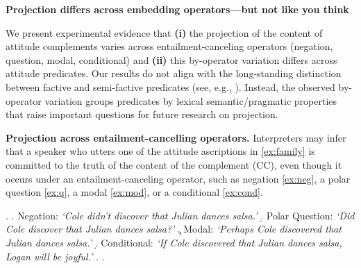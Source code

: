 \documentclass[12pt, a4paper]{article}
\begin{document}


\begin{center}
	\textbf{\large%
		Projection differs across embedding operators---but not like you think}
\end{center}

\vspace*{-.6\baselineskip}
\noindent 
	We present experimental evidence that \textbf{(i)} the projection of the content of attitude complements varies across entailment-canceling operators (negation, question, modal, conditional) and \textbf{(ii)} this by-operator variation differs across attitude predicates. Our results do not align with the long-standing distinction between factive and semi-factive predicates (see, e.g., \citealp{karttunen_observations_1971,hooper_applicability_1973,djarv_cognitive_2018}). Instead, the observed by-operator variation groups predicates by lexical semantic/pragmatic properties that raise important questions for future research on projection.

\noindent
	{\bf Projection across entailment-cancelling operators.} Interpreters may infer that a speaker who utters one of the attitude ascriptions in  \ref{ex:family} is committed to the truth of the content of the complement (CC),
	even though it occurs under an entailment-canceling operator, such as negation \ref{ex:neg}, a polar question \ref{ex:q}, a modal \ref{ex:mod}, or a conditional \ref{ex:cond}.


	\vspace{-.3\baselineskip}
	\ex. \label{ex:family}
		\a. \label{ex:neg}
			Negation: \hfill
			\emph{\lq Cole didn't discover that Julian dances salsa.\rq}
		\b. \label{ex:q}
			Polar Question: \hfill
			\emph{\lq Did Cole discover that Julian dances salsa?\rq}
		\c. \label{ex:mod}
			Modal: \hfill
			\emph{\lq Perhaps Cole discovered that Julian dances salsa.\rq}
		\d. \label{ex:cond}
			Conditional: \hfill
			\emph{\lq If Cole discovered that Julian dances salsa, Logan will be joyful.\rq}
		\z.
	\z.
\end{document}

